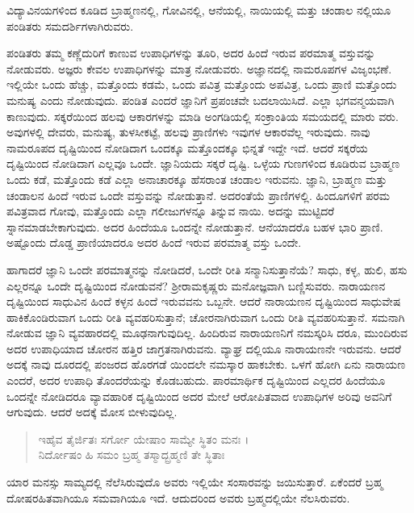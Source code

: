 {\small ವಿದ್ಯಾವಿನಯಗಳಿಂದ ಕೂಡಿದ ಬ್ರಾಹ್ಮಣನಲ್ಲಿ, ಗೋವಿನಲ್ಲಿ, ಆನೆಯಲ್ಲಿ, ನಾಯಿಯಲ್ಲಿ ಮತ್ತು ಚಂಡಾಲ ನಲ್ಲಿಯೂ ಪಂಡಿತರು ಸಮದರ್ಶಿಗಳಾಗಿರುವರು.}

ಪಂಡಿತರು ತಮ್ಮ ಕಣ್ಣೆದುರಿಗೆ ಕಾಣುವ ಉಪಾಧಿಗಳನ್ನು ತೂರಿ, ಅದರ ಹಿಂದೆ ಇರುವ ಪರಮಾತ್ಮ ವಸ್ತುವನ್ನು ನೋಡುವರು. ಅಜ್ಞರು ಕೇವಲ ಉಪಾಧಿಗಳನ್ನು ಮಾತ್ರ ನೋಡುವರು. ಅಜ್ಞಾನದಲ್ಲಿ ನಾಮರೂಪಗಳ ವಿಜೃಂಭಣೆ. ಇಲ್ಲಿಯೇ ಒಂದು ಹೆಚ್ಚು, ಮತ್ತೊಂದು ಕಡಮೆ, ಒಂದು ಪವಿತ್ರ ಮತ್ತೊಂದು ಅಪವಿತ್ರ, ಒಂದು ಪ್ರಾಣಿ ಮತ್ತೊಂದು ಮನುಷ್ಯ ಎಂದು ನೋಡುವುದು. ಪಂಡಿತ ಎಂದರೆ ಜ್ಞಾನಿಗೆ ಪ್ರಪಂಚವೇ ಬದಲಾಯಿಸಿದೆ. ಎಲ್ಲಾ ಭಗವನ್ಮಯವಾಗಿ ಕಾಣುವುದು. ಸಕ್ಕರೆಯಿಂದ ಹಲವು ಆಕಾರಗಳನ್ನು ಮಾಡಿ ಅಂಗಡಿಯಲ್ಲಿ ಸಂಕ್ರಾಂತಿಯ ಸಮಯದಲ್ಲಿ ಮಾರು ವರು. ಅವುಗಳಲ್ಲಿ ದೇವರು, ಮನುಷ್ಯ, ತುಳಸೀಕಟ್ಟೆ, ಹಲವು ಪ್ರಾಣಿಗಳು ಇವುಗಳ ಆಕಾರವೆಲ್ಲ ಇರುವುದು. ನಾವು ನಾಮರೂಪದ ದೃಷ್ಟಿಯಿಂದ ನೋಡಿದಾಗ ಒಂದಕ್ಕೂ ಮತ್ತೊಂದಕ್ಕೂ ಭಿನ್ನತೆ ಇದ್ದೇ ಇದೆ. ಆದರೆ ಸಕ್ಕರೆಯ ದೃಷ್ಟಿಯಿಂದ ನೋಡಿದಾಗ ಎಲ್ಲವೂ ಒಂದೇ. ಜ್ಞಾನಿಯದು ಸಕ್ಕರೆ ದೃಷ್ಟಿ. ಒಳ್ಳೆಯ ಗುಣಗಳಿಂದ ಕೂಡಿರುವ ಬ್ರಾಹ್ಮಣ ಒಂದು ಕಡೆ, ಮತ್ತೊಂದು ಕಡೆ ಎಲ್ಲಾ ಅನಾಚಾರಕ್ಕೂ ಹೆಸರಾಂತ ಚಂಡಾಲ ಇರುವನು. ಜ್ಞಾನಿ, ಬ್ರಾಹ್ಮಣ ಮತ್ತು ಚಂಡಾಲನ ಹಿಂದೆ ಇರುವ ಒಂದೇ ವಸ್ತುವನ್ನು ನೋಡುತ್ತಾನೆ. ಅದರಂತೆಯೆ ಪ್ರಾಣಿಗಳಲ್ಲಿ. ಹಿಂದೂಗಳಿಗೆ ಪರಮ ಪವಿತ್ರವಾದ ಗೋವು, ಮತ್ತೊಂದು ಎಲ್ಲಾ ಗಲೀಜುಗಳನ್ನೂ ತಿನ್ನುವ ನಾಯಿ. ಅದನ್ನು ಮುಟ್ಟಿದರೆ ಸ್ನಾನಮಾಡಬೇಕಾಗುವುದು. ಅದರ ಹಿಂದೆಯೂ ಒಂದನ್ನೇ ನೋಡುತ್ತಾನೆ. ಆನೆಯಾದರೊ ಬಹಳ ಭಾರಿ ಪ್ರಾಣಿ. ಅಷ್ಟೊಂದು ದೊಡ್ಡ ಪ್ರಾಣಿಯಾದರೂ ಅದರ ಹಿಂದೆ ಇರುವ ಪರಮಾತ್ಮ ವಸ್ತು ಒಂದೇ.

ಹಾಗಾದರೆ ಜ್ಞಾನಿ ಒಂದೇ ಪರಮಾತ್ಮನನ್ನು ನೋಡಿದರೆ, ಒಂದೇ ರೀತಿ ಸನ್ಮಾನಿಸುತ್ತಾನೆಯೆ? ಸಾಧು, ಕಳ್ಳ, ಹುಲಿ, ಹಸು ಎಲ್ಲರನ್ನೂ ಒಂದೇ ದೃಷ್ಟಿಯಿಂದ ನೋಡುವನೆ? ಶ್ರೀರಾಮಕೃಷ್ಣರು ಮನೋಜ್ಞವಾಗಿ ಬಣ್ಣಿಸುವರು. ನಾರಾಯಣನ ದೃಷ್ಟಿಯಿಂದ ಸಾಧುವಿನ ಹಿಂದೆ ಕಳ್ಳನ ಹಿಂದೆ ಇರುವವನು ಒಬ್ಬನೇ. ಆದರೆ ನಾರಾಯಣನ ದೃಷ್ಟಿಯಿಂದ ಸಾಧುವೇಷ ಹಾಕಿಕೊಂಡಿರುವಾಗ ಒಂದು ರೀತಿ ವ್ಯವಹರಿಸುತ್ತಾನೆ; ಚೋರನಾಗಿರುವಾಗ ಒಂದು ರೀತಿ ವ್ಯವಹರಿಸುತ್ತಾನೆ. ಸಮನಾಗಿ ನೋಡುವ ಜ್ಞಾನಿ ವ್ಯವಹಾರದಲ್ಲಿ ಮೂಢನಾಗುವುದಿಲ್ಲ. ಹಿಂದಿರುವ ನಾರಾಯಣನಿಗೆ ನಮಸ್ಕರಿಸಿ ದರೂ, ಮುಂದಿರುವ ಅದರ ಉಪಾಧಿಯಾದ ಚೋರನ ಹತ್ತಿರ ಜಾಗ್ರತನಾಗಿರುವನು. ವ್ಯಾಘ್ರ ದಲ್ಲಿಯೂ ನಾರಾಯಣನೇ ಇರುವನು. ಆದರೆ ಅದಕ್ಕೆ ನಾವು ದೂರದಲ್ಲಿ ಪಂಜರದ ಹೊರಗಡೆ ಯಿಂದಲೇ ನಮಸ್ಕಾರ ಹಾಕಬೇಕು. ಒಳಗೆ ಹೋಗಿ ಏನು ನಾರಾಯಣ ಎಂದರೆ, ಅದರ ಉಪಾಧಿ ತೊಂದರೆಯನ್ನು ಕೊಡಬಹುದು. ಪಾರಮಾರ್ಥಿಕ ದೃಷ್ಟಿಯಿಂದ ಎಲ್ಲದರ ಹಿಂದೆಯೂ ಒಂದನ್ನೇ ನೋಡಿದರೂ ವ್ಯಾವಹಾರಿಕ ದೃಷ್ಟಿಯಿಂದ ಅದರ ಮೇಲೆ ಆರೋಪಿತವಾದ ಉಪಾಧಿಗಳ ಅರಿವು ಅವನಿಗೆ ಆಗುವುದು. ಆದರೆ ಅದಕ್ಕೆ ಮೋಸ ಬೀಳುವುದಿಲ್ಲ.

\begin{verse}
ಇಹೈವ ತೈರ್ಜಿತಃ ಸರ್ಗೋ ಯೇಷಾಂ ಸಾಮ್ಯೇ ಸ್ಥಿತಂ ಮನಃ ।\\ನಿರ್ದೋಷಂ ಹಿ ಸಮಂ ಬ್ರಹ್ಮ ತಸ್ಮಾದ್ಬ್ರಹ್ಮಣಿ ತೇ ಸ್ಥಿತಾಃ 
\end{verse}

{\small ಯಾರ ಮನಸ್ಸು ಸಾಮ್ಯದಲ್ಲಿ ನೆಲೆಸಿರುವುದೊ ಅವರು ಇಲ್ಲಿಯೇ ಸಂಸಾರವನ್ನು ಜಯಿಸುತ್ತಾರೆ. ಏಕೆಂದರೆ ಬ್ರಹ್ಮ ದೋಷರಹಿತವಾಗಿಯೂ ಸಮವಾಗಿಯೂ ಇದೆ. ಆದುದರಿಂದ ಅವರು ಬ್ರಹ್ಮದಲ್ಲಿಯೇ ನೆಲಸಿರುವರು.}

